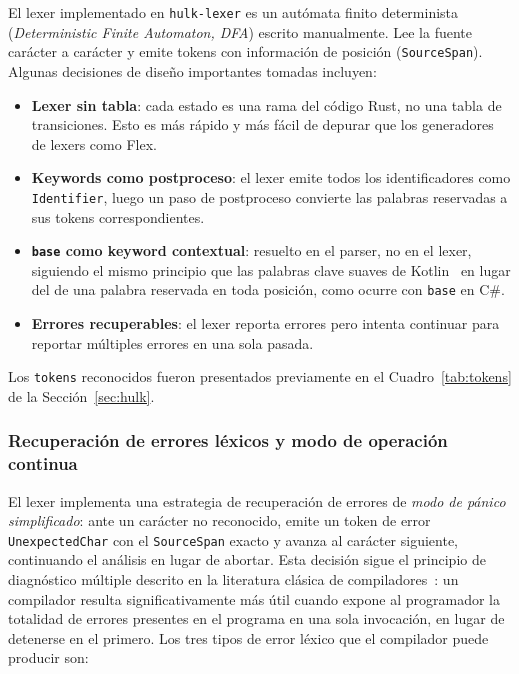\documentclass[12pt, a4paper]{article}
\begin{document}
El lexer implementado en \texttt{hulk-lexer} es un aut\'{o}mata finito determinista
(\textit{Deterministic Finite Automaton, DFA}) escrito manualmente. Lee la fuente car\'{a}cter a car\'{a}cter y emite tokens con
informaci\'{o}n de posici\'{o}n (\texttt{SourceSpan}). Algunas decisiones  de diseño importantes tomadas incluyen:
\begin{itemize}
    \item \textbf{Lexer sin tabla}: cada estado es una rama del c\'{o}digo Rust,
          no una tabla de transiciones. Esto es m\'{a}s r\'{a}pido y m\'{a}s f\'{a}cil de
          depurar que los generadores de lexers como Flex.
    \item \textbf{Keywords como postproceso}: el lexer emite todos los
          identificadores como \texttt{Identifier}, luego un paso de
          postproceso convierte las palabras reservadas a sus tokens
          correspondientes.
    \item \textbf{\texttt{base} como keyword contextual}: resuelto en el parser,
          no en el lexer, siguiendo el mismo principio que las palabras clave
          suaves de Kotlin~\cite{jemerov2017} en lugar del de una palabra reservada en toda
          posición, como ocurre con \texttt{base} en C\#.
    \item \textbf{Errores recuperables}: el lexer reporta errores pero intenta
          continuar para reportar m\'{u}ltiples errores en una sola pasada.
\end{itemize}
Los \texttt{tokens} reconocidos fueron presentados previamente en el Cuadro~\ref{tab:tokens} de la Sección~\ref{sec:hulk}.

\subsubsection{Recuperación de errores léxicos y modo de operación continua}

El lexer implementa una estrategia de recuperación de errores de
\textit{modo de pánico simplificado}: ante un carácter no reconocido, emite un
token de error \texttt{UnexpectedChar} con el \texttt{SourceSpan} exacto y
avanza al carácter siguiente, continuando el análisis en lugar de abortar.
Esta decisión sigue el principio de diagnóstico múltiple descrito en la
literatura clásica de compiladores~\cite{aho1986}: un compilador resulta
significativamente más útil cuando expone al programador la totalidad de errores
presentes en el programa en una sola invocación, en lugar de detenerse en el
primero. Los tres tipos de error léxico que el compilador puede producir son:
\end{document}
